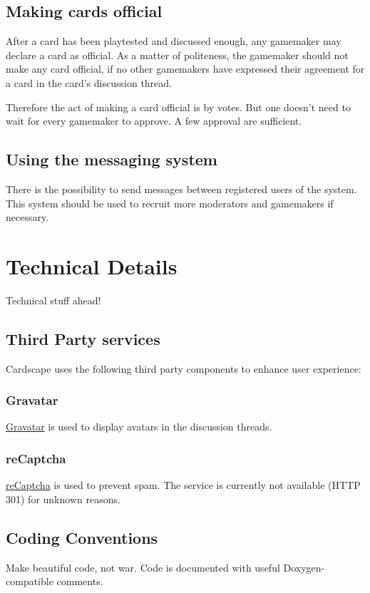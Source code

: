 \documentclass[a4paper, 11pt]{scrbook}
\begin{document}
\section{Making cards official}
After a card has been playtested and discussed enough, any gamemaker may declare a card as official. As a matter of politeness, the gamemaker should not make any card official, if no other gamemakers have expressed their agreement for a card in the card's discussion thread.

Therefore the act of making a card official is by votes. But one doesn't need to wait for every gamemaker to approve. A few approval are sufficient.

\section{Using the messaging system}
There is the possibility to send messages between registered users of the system. This system should be used to recruit more moderators and gamemakers if necessary.


\chapter{Technical Details}
Technical stuff ahead!

\section{Third Party services}

Cardscape uses the following third party components to enhance user experience:
\subsection{Gravatar}
\href{http://www.gravatar.com/}{Gravatar} is used to display avatars in the discussion threads.

\subsection[reCaptcha]{reCaptcha}
\href{http://www.recaptcha.net}{reCaptcha} is used to prevent spam. The service is currently not available (HTTP 301) for unknown reasons.

\section{Coding Conventions}
Make beautiful code, not war. Code is documented with useful Doxygen-compatible comments.
\end{document}
